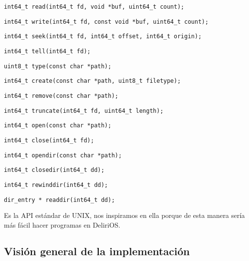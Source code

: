 \begin{lstlisting}[style=customc]
int64_t read(int64_t fd, void *buf, uint64_t count);
\end{lstlisting}
\begin{lstlisting}[style=customc]
int64_t write(int64_t fd, const void *buf, uint64_t count);
\end{lstlisting}
\begin{lstlisting}[style=customc]
int64_t seek(int64_t fd, int64_t offset, int64_t origin);
\end{lstlisting}
\begin{lstlisting}[style=customc]
int64_t tell(int64_t fd);
\end{lstlisting}
\begin{lstlisting}[style=customc]
uint8_t type(const char *path);
\end{lstlisting}
\begin{lstlisting}[style=customc]
int64_t create(const char *path, uint8_t filetype);
\end{lstlisting}
\begin{lstlisting}[style=customc]
int64_t remove(const char *path); 
\end{lstlisting}
\begin{lstlisting}[style=customc]
int64_t truncate(int64_t fd, uint64_t length);
\end{lstlisting}
\begin{lstlisting}[style=customc]
int64_t open(const char *path);
\end{lstlisting}
\begin{lstlisting}[style=customc]
int64_t close(int64_t fd);
\end{lstlisting}
\begin{lstlisting}[style=customc]
int64_t opendir(const char *path);
\end{lstlisting}
\begin{lstlisting}[style=customc]
int64_t closedir(int64_t dd);
\end{lstlisting}
\begin{lstlisting}[style=customc]
int64_t rewinddir(int64_t dd);
\end{lstlisting}
\begin{lstlisting}[style=customc]
dir_entry * readdir(int64_t dd);
\end{lstlisting}


Es la API estándar de UNIX, nos inspiramos en ella porque de esta manera sería más fácil hacer programas en DeliriOS. 


\subsection{Visión general de la implementación}

